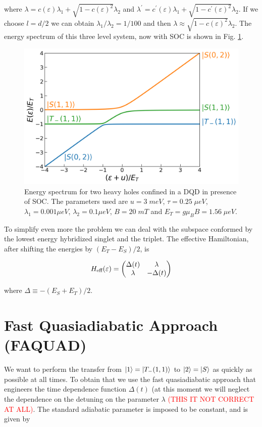 \documentclass[aip,rsi,amsmath,amssymb,reprint, english]{revtex4-1}
\begin{document}
where $\lambda=c(\varepsilon)\lambda_1+\sqrt{1-c(\varepsilon)^2}\lambda_2$ and $\lambda^{\prime}=c^{\prime}(\varepsilon)\lambda_1+\sqrt{1-c^{\prime}(\varepsilon)^2}\lambda_2$. If we choose $l=d/2$ we can obtain $\lambda_1/\lambda_2=1/100$ and then $\lambda\approx \sqrt{1-c(\varepsilon)^2}\lambda_2$. The energy spectrum of this three level system, now with SOC is shown in Fig. \ref{fig:spectrum_2}.

\begin{figure}[h!]
	\centering
	\includegraphics[width=\linewidth]{spectrum_3_levels_wSOC}
	\caption{Energy spectrum for two heavy holes confined in a DQD in presence of SOC. The parameters used are $u=3\; meV$, $\tau=0.25 \; \mu eV$, $\lambda_1=0.001 \mu eV$, $\lambda_2=0.1\mu eV$, $B=20\; mT$ and $E_T=g\mu_B B=1.56 \; \mu eV$.}
	\label{fig:spectrum_2}
\end{figure}

To simplify even more the problem we can deal with the subspace conformed by the lowest energy hybridized singlet and the triplet. The effective Hamiltonian, after shifting the energies by $(E_T-E_S)/2$, is 

\begin{equation}
	H_{\text{eff}}(\varepsilon)=\mqty(\Delta(t) & \lambda \\ \lambda & -\Delta (t))
\end{equation} 

where $\Delta\equiv-(E_S+E_T)/2$.

\section{Fast Quasiadiabatic Approach (FAQUAD)}

We want to perform the transfer from $\ket{1}=\ket{T_-(1,1)}$ to $\ket{2}=\ket{S}$ as quickly as possible at all times. To obtain that we use the fast quasiadiabatic approach that engineers the time dependence function $\Delta(t)$ (at this moment we will neglect the dependence on the detuning on the parameter $\lambda$ \textcolor{red}{(THIS IT NOT CORRECT AT ALL)}. The standard adiabatic parameter is imposed to be constant, and is given by
\end{document}
